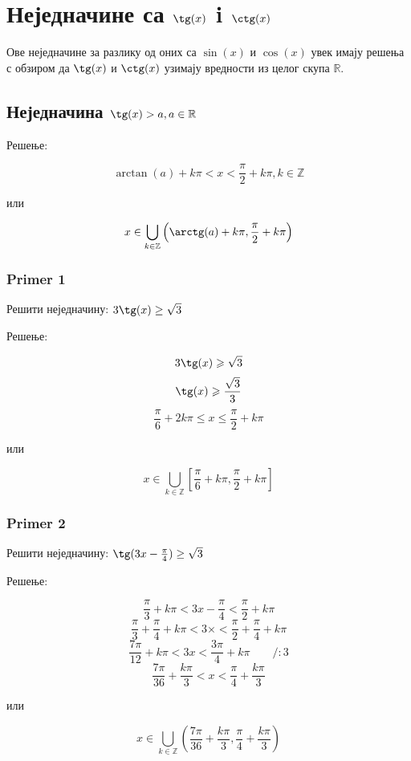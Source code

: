 \documentclass[a4paper,12pt]{article}
\begin{document}
\newpage
\section{Неједначине са $\tg(x)$ i $\ctg(x)$}

Ове неједначине за разлику од оних са $\sin(x)$ и $\cos(x)$ увек имају решења с обзиром да $\tg(x)$ и $\ctg(x)$ узимају вредности из целог скупа $\mathbb{R}$.

\subsection{Неједначина $\tg(x)>a,a\in\mathbb{R}$}

Решење:

\[\arctan(a)+k\pi<x<\frac{\pi}{2}+k\pi,k\in\mathbb{Z}\]
\centerline{или}
\[x\in\bigcup_{k\in\mathbb{Z}}\left(\arctg(a)+k\pi,\frac{\pi}{2}+k\pi\right)\]

\subsubsection{Primer 1}

Решити неједначину: $3\tg(x)\ge\sqrt3$

Решење:

\[3\tg(x)\geqslant\sqrt{3}\]
\[\tg(x)\geqslant\frac{\sqrt{3}}{3}\]
\[\frac{\pi}{6}+2k\pi\leqslant x\leqslant\frac{\pi}{2}+k\pi\]
\centerline{или}
\[x\in\bigcup_{k\in\mathbb{Z}}\left[\frac{\pi}{6}+k\pi,\frac{\pi}{2}+k\pi\right]\]

\subsubsection{Primer 2}

Решити неједначину: $\tg(3x-\frac{\pi}{4})\ge\sqrt3$

Решење:

\[\frac{\pi}{3}+k\pi<3x-\frac{\pi}{4}<\frac{\pi}{2}+k\pi\]
\[\frac{\pi}{3}+\frac{\pi}{4}+k\pi<3\times<\frac{\pi}{2}+\frac{\pi}{4}+k\pi\]
\[\frac{7\pi}{12}+k\pi<3x<\frac{3\pi}{4}+k\pi\qquad/:3\]
\[\frac{7\pi}{36}+\frac{k\pi}{3}<x<\frac{\pi}{4}+\frac{k\pi}{3}\]
\centerline{или}
\[x\in\bigcup_{k\in\mathbb{Z}}\left(\frac{7\pi}{36}+\frac{k\pi}{3},\frac{\pi}{4}+\frac{k\pi}{3}\right)\]

\end{document}
